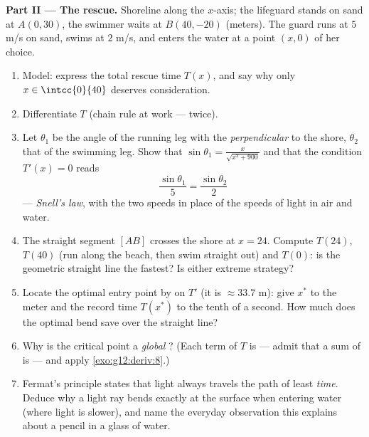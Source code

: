 \begin{problem}
\medskip
\noindent\textbf{Part II --- The rescue.}
Shoreline along the $x$-axis; the lifeguard stands on sand at
$A(0, 30)$, the swimmer waits at $B(40, -20)$ (meters). The
guard runs at $5$ m/s on sand, swims at $2$ m/s, and enters the
water at a point $(x, 0)$ of her choice.
\begin{enumerate}[resume]
  \item Model: express the total rescue time $T(x)$, and say why
        only $x \in \intcc{0}{40}$ deserves consideration.
  \item Differentiate $T$ (chain rule at work --- twice).
  \item Let $\theta_1$ be the angle of the running leg with the
        \emph{perpendicular} to the shore, $\theta_2$ that of
        the swimming leg. Show that
        $\sin\theta_1 = \frac{x}{\sqrt{x^2 + 900}}$ and that
        the condition $T'(x) = 0$ reads
        \[
        \frac{\sin\theta_1}{5} = \frac{\sin\theta_2}{2}
        \]
        --- \emph{Snell's law}, with the two speeds in place of
        the speeds of light in air and water.
  \item The straight segment $[AB]$ crosses the shore at
        $x = 24$. Compute $T(24)$, $T(40)$ (run along the
        beach, then swim straight out) and $T(0)$: is the
        geometric straight line the fastest? Is either extreme
        strategy?
  \item Locate the optimal entry point by  on
        $T'$ (it is $\approx 33.7$ m): give $x^*$ to the meter
        and the record time $T(x^*)$ to the tenth of a second.
        How much does the optimal bend save over the straight
        line?
  \item Why is the critical point a \emph{global} ?
        (Each term of $T$ is  --- admit that a sum of
          is  --- and apply
        \cref{exo:g12:deriv:8}.)
  \item Fermat's principle states that light always travels the
        path of least \emph{time}. Deduce why a light ray bends
        exactly at the surface when entering water
        (where light is slower), and name the everyday
        observation this explains about a pencil in a glass of
        water.
\end{enumerate}


\end{problem}
